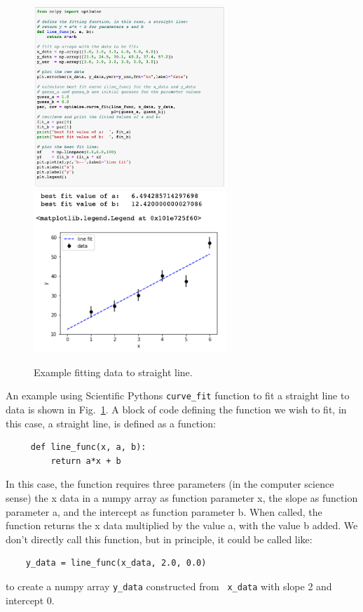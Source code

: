 \begin{figure}[htbp]
\begin{center}
\includegraphics[width=0.65\textwidth]{figs/labs/fitting/fit_code.png} \\
\includegraphics[width=0.65\textwidth]{figs/labs/fitting/fit_out.png} \\
\caption{Example fitting data to straight line.}
\label{fig:fiteg}
\end{center}
\end{figure}

An example using Scientific Pythons {\tt curve{\_}fit} function to fit
a straight line to data is shown in Fig.~\ref{fig:fiteg}.  A block of 
code defining the function we wish to fit, in this case, a straight
line, is defined as a function:
\begin{verbatim}
     def line_func(x, a, b):
         return a*x + b
\end{verbatim}
In this case, the function requires three parameters (in the computer
science sense) the x data in a numpy array as function parameter x,
the slope as function parameter a, and the intercept as function
parameter b.  When called, the function returns the x data multiplied
by the value a, with the value b added.  We don't directly call this
function, but in principle, it could be called like:
\begin{verbatim}
    y_data = line_func(x_data, 2.0, 0.0)
\end{verbatim}
to create a numpy array {\tt y{\_}data} constructed from {\tt
  x{\_}data} with slope 2 and intercept 0.


